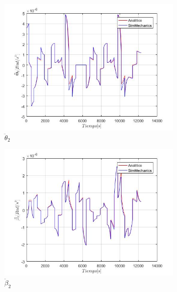 \begin{figure}
\begin{subfigure}{0.45\textwidth}
        \includegraphics[width=\linewidth]{Cap4_DisenoBasico/Figura/ComparativoSimMechanics/ThetaPPunto2.jpg}
        \caption{$\ddot{\theta}_2$}
    \end{subfigure}
    \begin{subfigure}{0.45\textwidth}
        \includegraphics[width=\linewidth]{Cap4_DisenoBasico/Figura/ComparativoSimMechanics/BetaPPunto2.jpg}
        \caption{$\ddot{\beta}_2$}
    \end{subfigure}
    \begin{subfigure}{0.45\textwidth}

\end{subfigure}
\end{figure}
